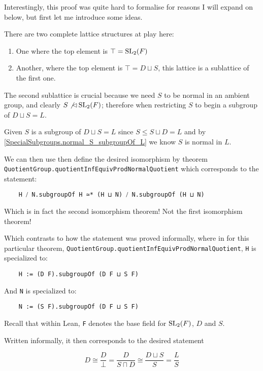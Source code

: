 \begin{remark}
Interestingly, this proof was quite hard to formalise for reasons I will expand on below, but first let me introduce some ideas.

There are two complete lattice structures at play here:
\begin{enumerate}
  \item One where the top element is $\top = \operatorname{SL}_2(F)$
  \item Another, where the top element is $\top = D \sqcup S$, this lattice is a sublattice of the first one.
\end{enumerate}  

The second sublattice is crucial because we need $S$ to be normal in an ambient group, and clearly $S \not\lhd \operatorname{SL}_2(F)$; therefore when restricting $S$ to begin a
subgroup of $D \sqcup S = L$. 

Given $S$ is a subgroup of $D \sqcup S = L$ since $S \le S\sqcup D = L$ and by \ref{SpecialSubgroups.normal_S_subgroupOf_L}
we know $S$ is normal in $L$.

We can then use then define the desired isomorphism by theorem
\texttt{QuotientGroup.quotientInfEquivProdNormalQuotient} which corresponds to the statement:

\begin{footnotesize}
\begin{verbatim}
    H ⧸ N.subgroupOf H ≃* (H ⊔ N) ⧸ N.subgroupOf (H ⊔ N)
\end{verbatim}
\end{footnotesize}


Which is in fact the second isomorphism theorem! Not the first isomorphism theorem! 

Which contrasts to how the statement was proved informally, where in for this particular theorem,
\texttt{QuotientGroup.quotientInfEquivProdNormalQuotient}, \texttt{H} is specialized to:

\begin{footnotesize}
\begin{verbatim}
    H := (D F).subgroupOf (D F ⊔ S F)
\end{verbatim}
\end{footnotesize}


And \texttt{N} is specialized to:

\begin{footnotesize}
\begin{verbatim}
    N := (S F).subgroupOf (D F ⊔ S F)
\end{verbatim}
\end{footnotesize}


Recall that within Lean, \texttt{F} denotes the base field for $\operatorname{SL}_2(F)$, $D$ and $S$.

Written informally, it then corresponds to the desired statement

\[
D \cong \frac{D}{\bot} = \frac{D}{S \sqcap D} \cong \frac{D \sqcup S}{S} = \frac{L}{S}
\]
\end{remark}

